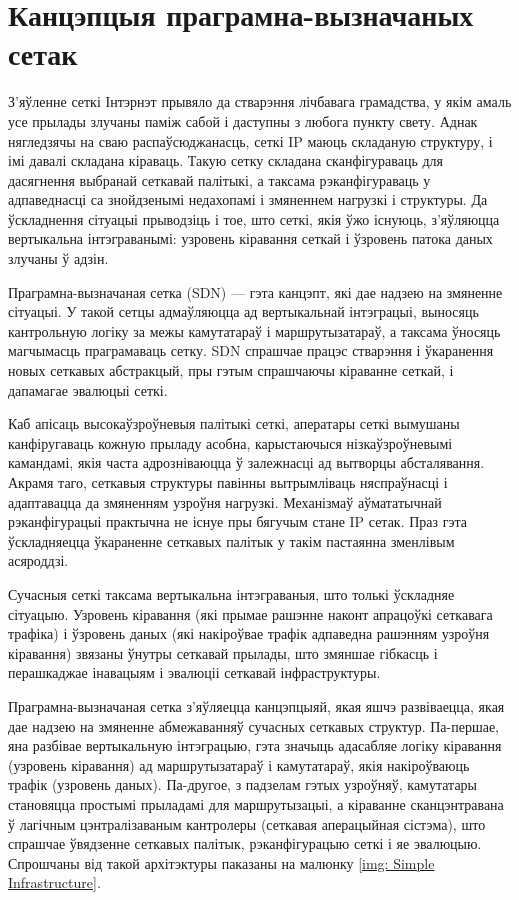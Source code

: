 \section{Канцэпцыя праграмна-вызначаных сетак}

З'яўленне сеткі Інтэрнэт прывяло да стварэння лічбавага грамадства, у якім
амаль усе прылады злучаны паміж сабой і даступны з любога пункту свету.
Аднак нягледзячы на сваю распаўсюджанасць, сеткі IP маюць складаную структуру, і імі
давалі складана кіраваць. Такую сетку складана сканфігураваць для дасягнення выбранай
сеткавай палітыкі, а таксама рэканфігураваць у адпаведнасці са знойдзенымі недахопамі і
змяненнем нагрузкі і структуры. Да ўскладнення сітуацыі прыводзіць і тое, што сеткі,
якія ўжо існуюць, з'яўляюцца вертыкальна інтэграванымі: узровень кіравання сеткай і
ўзровень патока даных злучаны ў адзін.

Праграмна-вызначаная сетка (SDN) --- гэта канцэпт, які дае надзею на змяненне сітуацыі.
У такой сетцы адмаўляюцца ад вертыкальнай інтэграцыі, выносяць кантрольную логіку
за межы камутатараў і маршрутызатараў, а таксама ўносяць магчымасць праграмаваць сетку.
SDN спрашчае працэс стварэння і ўкаранення новых сеткавых абстракцый, пры гэтым
спрашчаючы кіраванне сеткай, і дапамагае эвалюцыі сеткі.

Каб апісаць высокаўзроўневыя палітыкі сеткі, аператары сеткі вымушаны канфіругаваць кожную
прыладу асобна, карыстаючыся нізкаўзроўневымі камандамі, якія часта адрозніваюцца ў
залежнасці ад вытворцы абсталявання. Акрамя таго, сеткавыя структуры павінны
вытрымліваць няспраўнасці і адаптавацца да змяненням узроўня нагрузкі.
Механізмаў аўмататычнай рэканфігурацыі практычна не існуе пры бягучым стане IP сетак.
Праз гэта ўскладняецца ўкараненне сеткавых палітык у такім пастаянна зменлівым асяроддзі.

Сучасныя сеткі таксама вертыкальна інтэграваныя, што толькі ўскладняе сітуацыю.
Узровень кіравання (які прымае рашэнне наконт апрацоўкі сеткавага трафіка) і
ўзровень даных (які накіроўвае трафік адпаведна рашэнням узроўня кіравання) звязаны
ўнутры сеткавай прылады, што змяншае гібкасць і перашкаджае інавацыям і эвалюціі
сеткавай інфраструктуры.

Праграмна-вызначаная сетка з'яўляецца канцэпцыяй, якая яшчэ развіваецца, якая дае надзею
на змяненне абмежаванняў сучасных сеткавых структур.
Па-першае, яна разбівае вертыкальную інтэграцыю, гэта значыць адасабляе логіку кіравання
(узровень кіравання) ад маршрутызатараў і камутатараў, якія накіроўваюць трафік (узровень даных).
Па-другое, з падзелам гэтых узроўняў, камутатары становяцца простымі прыладамі для маршрутызацыі,
а кіраванне сканцэнтравана ў лагічным цэнтралізаваным кантролеры (сеткавая аперацыйная сістэма),
што спрашчае ўвядзенне сеткавых палітык, рэканфігурацыю сеткі і яе эвалюцыю.
Спрошчаны від такой архітэктуры паказаны на малюнку \ref{img: Simple Infrastructure}.

